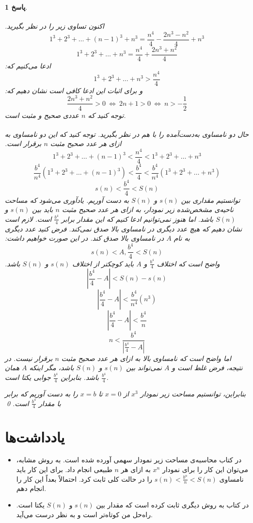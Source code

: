 \documentclass[a4paper,12pt]{article}
\theoremstyle{exercise}
\newtheorem{solution}{پاسخ}
\begin{document}
\begin{solution}
		\\
		\\
		اکنون تساوی زیر را در نظر بگیرید.
		$$1^3 + 2^3 + \dots + (n-1)^3 + n^3= \frac{n^4}{4} - \frac{2n^3 - n^2}{4} + n^3$$
		$$1^3 + 2^3 + \dots + n^3= \frac{n^4}{4} + \frac{2n^3 + n^2}{4}$$
		ادعا می‌کنیم که:
		$$1^3 + 2^3 + \dots + n^3 > \frac{n^4}{4}$$
		و برای اثبات این ادعا کافی است نشان دهیم که:
		$$\frac{2n^3 + n^2}{4} > 0 \ \Leftrightarrow \ 2n+1 > 0 \ \Leftrightarrow \ n > -\frac{1}{2}$$
		توجه کنید که $n$ عددی صحیح و مثبت است.
		\\
		\\
		حال دو نامساوی به‌دست‌آمده را با هم در نظر بگیرید. توجه کنید که این دو نامساوی به ازای هر عدد صحیح مثبت $n$ برقرار است.
		$$1^3 + 2^3 + \dots + (n-1)^3 < \frac{n^4}{4} < 1^3 + 2^3 + \dots + n^3$$
		$$\frac{b^4}{n^4} \left( 1^3 + 2^3 + \dots + (n-1)^3 \right) < \frac{b^4}{4} < \frac{b^4}{n^4} \left( 1^3 + 2^3 + \dots + n^3 \right)$$
		$$s(n) < \frac{b^4}{4} < S(n)$$
		توانستیم مقداری بین $s(n)$ و $S(n)$ به دست آوریم. یادآوری می‌شود که مساحت ناحیه‌ی مشخص‌شده زیر نمودار، به ازای هر عدد صحیح مثبت $n$ باید بین $s(n)$ و $S(n)$ باشد. اما هنوز نمی‌توانیم ادعا کنیم که این مقدار برابر
		$\frac{b^4}{4}$
		است. لازم است نشان دهیم که هیچ عدد دیگری در نامساوی بالا صدق نمی‌کند. فرض کنید عدد دیگری به نام $A$ در نامساوی بالا صدق کند. در این صورت خواهیم داشت:
		$$s(n) < A, \frac{b^4}{4} < S(n)$$
		واضح است که اختلاف
		$\frac{b^4}{4}$
		و $A$ باید کوچکتر از اختلاف $s(n)$ و $S(n)$ باشد.
		$$\left| \frac{b^4}{4} - A \right| < S(n) - s(n)$$
		$$\left| \frac{b^4}{4} - A \right| < \frac{b^4}{n^4}(n^3)$$
		$$\left| \frac{b^4}{4} - A \right| < \frac{b^4}{n}$$
		$$n < \frac{b^4}{\left| \frac{b^4}{4} - A \right|}$$
		اما واضح است که نامساوی بالا به ازای هر عدد صحیح مثبت $n$ برقرار نیست. در نتیجه، فرض غلط است و $A$ نمی‌تواند بین $s(n)$ و $S(n)$ باشد، مگر اینکه $A$ همان
		$\frac{b^4}{4}$
		باشد. بنابراین
		$\frac{b^4}{4}$
		جوابی یکتا است.
		
		بنابراین، توانستیم مساحت زیر نمودار
		$x^3$
		از
		$x=0$
		تا
		$x=b$
		را به دست آوریم که برابر با مقدار $\frac{b^4}{4}$ است.
		\qed
	\end{solution}
	
	\section*{یادداشت‌ها}
	\begin{itemize}
		\item
		در کتاب  محاسبه‌ی مساحت زیر نمودار سهمی آورده شده است. به روش مشابه، می‌توان این کار را برای نمودار
		$x^n$
		به ازای هر $n$ طبیعی انجام داد. برای این کار باید نامساوی $s(n) < \frac{b^n}{n} < S(n)$ را در حالت کلی ثابت کرد. احتمالاً بعداً این کار را انجام دهم.
		\item 
		در کتاب  به روش دیگری ثابت کرده است که مقدار بین $s(n)$ و $S(n)$ یکتا است. راه‌حل من کوتاه‌تر است و به نظر درست می‌آید.
	\end{itemize}
	
\end{document}
